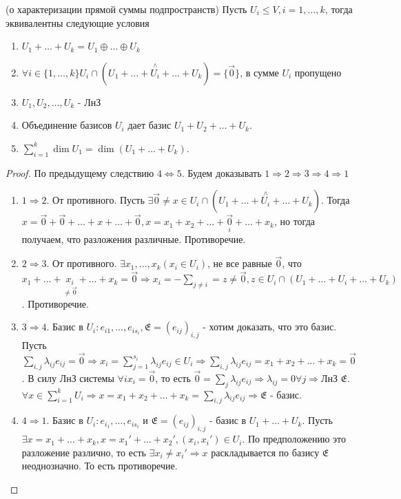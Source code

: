 \begin{theorem}
	(о характеризации прямой суммы подпространств) \newline
	Пусть \(U_i\le V, i = 1, \ldots, k\), тогда эквивалентны следующие условия
	\begin{enumerate}
		\item \(U_1+\ldots+U_k = U_1\oplus\ldots\oplus U_k\)
		\item \(\forall i\in\{1,\ldots, k\}U_i\cap(U_1+\ldots + \overset{\wedge}{U_i}+\ldots +U_k)=\{\vec 0\}\), в сумме \(U_i\) пропущено
		\item \(U_1, U_2, \ldots, U_k\) - ЛнЗ
		\item Объединение базисов \(U_i\) дает базис \(U_1+U_2+\ldots+U_k\).
		\item $\sum_{i=1}^{k}\dim U_1 = \dim (U_1 + \ldots + U_k).$
	\end{enumerate}
\end{theorem}
\begin{proof}
	По предыдущему следствию \(4\Longleftrightarrow5\). Будем доказывать \(1\Longrightarrow 2\Longrightarrow 3\Longrightarrow 4\Longrightarrow 1\)
	\begin{enumerate}
		\item \(1\Longrightarrow 2\). От противного. Пусть \(\exists \vec 0 \ne x \in U_i\cap(U_1+\ldots+\overset{\wedge}{U_i}+\ldots+U_k)\). Тогда \(x = \vec 0 + \vec 0 + \ldots + x + \ldots + \vec 0, x = x_1 + x_2 + \ldots + \underset{i}{\vec 0} + \ldots + x_k\), но тогда получаем, что разложения различные. Противоречие. 
		\item  \(2\Longrightarrow 3\). От противного. \(\exists x_1, \ldots, x_k(x_i\in U_i)\), не все равные \(\vec 0\), что \(x_1 + \ldots + \underset{\ne \vec 0}{x_i} + \ldots+x_k = \vec 0\Longrightarrow x_i = -\sum_{j\ne i} = z\ne \vec 0, z\in U_i\cap(U_1 + \ldots + U_i + \ldots + U_k)\). Противоречие.
		\item \(3\Longrightarrow 4\). Базис в \(U_i: e_{i1}, \ldots, e_{is_i}, \mathfrak{E} = (e_{ij})_{i,j}\) - хотим доказать, что это базис. Пусть \(\sum_{i,j}\lambda_{ij}e_{ij} = \vec 0 \Longrightarrow x_i = \sum_{j=1}^{s_i}\lambda_{ij}e_{ij}\in U_i\Longrightarrow \sum_{i,j}\lambda_{ij}e_{ij} = x_1 + x_2 + \ldots + x_k = \vec 0\). В силу ЛнЗ системы \(\forall i x_i = \vec 0\), то есть \(\vec 0 = \sum_{j}\lambda_{ij}e_{ij}\Longrightarrow \lambda_{ij} = 0 \forall j\Longrightarrow \)ЛнЗ \(\mathfrak{E}\). \(\forall x\in \sum_{i=1}^{k}U_i\Longrightarrow x = x_1 + x_2 + \ldots + x_k = \sum_{i,j}\lambda_{ij}e_{ij}\Longrightarrow \mathfrak{E}\) - базис.
		\item \(4\Longrightarrow 1\). Базис в \(U_i: e_{i_1},\ldots, e_{is_i}\) и \(\mathfrak{E} = (e_{ij})_{i,j}\) - базис в \(U_1 + \ldots + U_k\). Пусть \(\exists x = x_1 + \ldots + x_k, x = x_1' + \ldots + x_2', (x_i, x_i')\in U_i\). По предположению это разложение различно, то есть \(\exists x_i\ne x_i'\Longrightarrow x\) раскладывается по базису \(\mathfrak{E}\) неоднозначно. То есть противоречие.
	\end{enumerate}
\end{proof}
